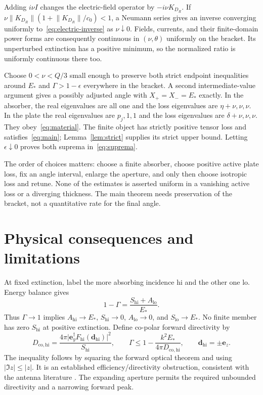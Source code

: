 \documentclass[11pt]{article}
\newcommand{\ey}{\mathbf e_y}
\newcommand{\ez}{\mathbf e_z}
\newcommand{\norm}[1]{\lVert #1\rVert}
\newcommand{\abs}[1]{\lvert #1\rvert}
\begin{document}
Adding $i\nu I$ changes the electric-field operator by $-i\nu K_{D_R}$. If $\nu\norm{K_{D_R}}(1+\norm{K_{D_R}}/c_0)<1$, a Neumann series gives an inverse converging uniformly to~\eqref{eq:electric-inverse} as $\nu\downarrow0$. Fields, currents, and their finite-domain power forms are consequently continuous in $(\nu,\theta)$ uniformly on the bracket. Its unperturbed extinction has a positive minimum, so the normalized ratio is uniformly continuous there too.

Choose $0<\nu<Q/3$ small enough to preserve both strict endpoint inequalities around $E_*$ and $\Gamma>1-\epsilon$ everywhere in the bracket. A second intermediate-value argument gives a possibly adjusted angle with $X_+=X_-=E_*$ exactly. In the absorber, the real eigenvalues are all one and the loss eigenvalues are $\eta+\nu,\nu,\nu$. In the plate the real eigenvalues are $p_j,1,1$ and the loss eigenvalues are $\delta+\nu,\nu,\nu$. They obey~\eqref{eq:material}. The finite object has strictly positive tensor loss and satisfies~\eqref{eq:main}; Lemma~\ref{lem:strict} supplies its strict upper bound. Letting $\epsilon\downarrow0$ proves both suprema in~\eqref{eq:suprema}.

The order of choices matters: choose a finite absorber, choose positive active plate loss, fix an angle interval, enlarge the aperture, and only then choose isotropic loss and retune. None of the estimates is asserted uniform in a vanishing active loss or a diverging thickness. The main theorem needs preservation of the bracket, not a quantitative rate for the final angle.

\section{Physical consequences and limitations}\label{sec:consequences}
At fixed extinction, label the more absorbing incidence $\mathrm{hi}$ and the other one $\mathrm{lo}$. Energy balance gives
\begin{equation}\label{eq:deficit}
 1-\Gamma=\frac{S_{\mathrm{hi}}+A_{\mathrm{lo}}}{E_*}.
\end{equation}
Thus $\Gamma\to1$ implies $A_{\mathrm{hi}}\to E_*$, $S_{\mathrm{hi}}\to0$, $A_{\mathrm{lo}}\to0$, and $S_{\mathrm{lo}}\to E_*$. No finite member has zero $S_{\mathrm{hi}}$ at positive extinction. Define co-polar forward directivity by
\begin{equation}\label{eq:directivity}
 D_{\mathrm{co},\mathrm{hi}}=\frac{4\pi\abs{\ey^\dagger F_{\mathrm{hi}}(\mathbf d_{\mathrm{hi}})}^2}{S_{\mathrm{hi}}},\qquad
 \Gamma\leq1-\frac{k^2E_*}{4\pi D_{\mathrm{co},\mathrm{hi}}},\qquad\mathbf d_{\mathrm{hi}}=\pm\ez.
\end{equation}
The inequality follows by squaring the forward optical theorem and using $\abs{\Im z}\leq\abs z$. It is an established efficiency/directivity obstruction, consistent with the antenna literature \citep{AndersenFrandsen2005}. The expanding aperture permits the required unbounded directivity and a narrowing forward peak.
\end{document}
